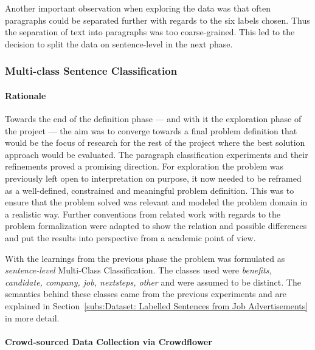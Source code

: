 Another important observation when exploring the data was that often paragraphs could be separated further with regards to the six labels chosen. Thus the separation of text into paragraphs was too coarse-grained. This led to the decision to split the data on sentence-level in the next phase.

\subsubsection{Multi-class Sentence Classification}
\label{subs:Multi-class Sentence Classification}

\paragraph{Rationale}
\label{par:Rationale}

Towards the end of the definition phase --- and with it the exploration phase of the project --- the aim was to converge towards a final problem definition that would be the focus of research for the rest of the project where the best solution approach would be evaluated. The paragraph classification experiments and their refinements proved a promising direction. For exploration the problem was previously left open to interpretation on purpose, it now needed to be reframed as a well-defined, constrained and meaningful problem definition. This was to ensure that the problem solved was relevant and modeled the problem domain in a realistic way. Further conventions from related work with regards to the problem formalization were adapted to show the relation and possible differences and put the results into perspective from a academic point of view.

With the learnings from the previous phase the problem was formulated as \emph{sentence-level} \gls{Multi-Class Classification}. The classes used were \emph{benefits, candidate, company, job, nextsteps, other}  and were assumed to be distinct. The semantics behind these classes came from the previous experiments and are explained in Section~\ref{subs:Dataset: Labelled Sentences from Job Advertisements} in more detail.

\paragraph{Crowd-sourced Data Collection via Crowdflower}
\label{par:Crowd-sourced Data Collection via Crowdflower}

